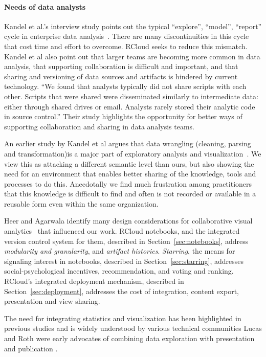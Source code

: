 \paragraph*{Needs of data analysts}
Kandel et al.'s interview study points out the typical ``explore'',
``model'', ``report'' cycle in enterprise data
analysis~\cite{Kandel:2012:EDA}. There are many discontinuities in
this cycle that cost time and effort to overcome. RCloud seeks to
reduce this mismatch. Kandel et al also point out that larger teams
are becoming more common in data analysis, that supporting
collaboration is difficult and important, and that sharing
and versioning of data sources and artifacts is hindered by current
technology. ``We found that analysts typically did not
share scripts with each other. Scripts that were shared were
disseminated similarly to intermediate data: either through shared
drives or email. Analysts rarely stored their analytic code in source
control.'' Their study highlights the opportunity for better ways
of supporting collaboration and sharing in data analysis teams.

An earlier study by Kandel et al argues that data wrangling
(cleaning, parsing and transformation)is a major part of exploratory
analysis and visualization~\cite{Kandel:2011:RDI}. We view this
as attacking a different semantic level than ours, but also
showing the need for an environment that enables better sharing
of the knowledge, tools and processes to do this. Anecdotally
we find much frustration among practitioners that this knowledge
is difficult to find and often is not recorded or available in a
reusable form even within the same organization.

Heer and Agarwala identify many design considerations for
collaborative visual analytics~\cite{Heer:2008:DCF} that
influenced our work.
RCloud notebooks, and the integrated version control system for them,
described in Section~\ref{sec:notebooks}, address {\it modularity and
granularity}, and {\it artifact histories}.
\emph{Starring}, the means for signaling interest in notebooks, described in
Section~\ref{sec:starring}, addresses social-psychological incentives,
recommendation, and voting and ranking. RCloud's integrated deployment
mechanism, described in Section~\ref{sec:deployment}, addresses the cost of
integration, content export, presentation and view sharing.

The need for integrating statistics and visualization has been
highlighted in previous studies and is widely understood by
various technical communities \cite{Perer:2008:ISA}
Lucas and Roth were early advocates of combining
data exploration with presentation and publication \cite{Lucas:1996:EIV}.

